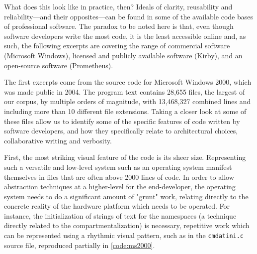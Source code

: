 \vspace*{1\baselineskip}

What does this look like in practice, then? Ideals of clarity, reusability and reliability—and their opposites—can be found in some of the available code bases of professional software. The paradox to be noted here is that, even though software developers write the most code, it is the least accessible online and, as such, the following excerpts are covering the range of commercial software (Microsoft Windows), licensed and publicly available software (Kirby), and an open-source software (Prometheus).

The first excerpts come from the source code for Microsoft Windows 2000, which was made public in 2004. The program text contains  28,655 files, the largest of our  corpus, by multiple orders of magnitude, with 13,468,327 combined lines and including more than 10 different file extensions. Taking a closer look at some of these files allow us to identify some of the specific features of code written by software developers, and how they specifically relate to architectural choices, collaborative writing and verbosity.

First, the most striking visual feature of the code is its sheer size. Representing such a versatile and low-level system such as an operating system manifest themselves in files that are often above 2000 lines of code. In order to allow abstraction techniques at a higher-level for the end-developer, the operating system needs to do a significant amount of "grunt" work, relating directly to the concrete reality of the hardware platform which needs to be operated. For instance, the initialization of strings of text for the namespaces (a technique directly related to the compartmentalization) is necessary, repetitive work which can be represented using a rhythmic visual pattern, such as in the \lstinline{cmdatini.c} source file, reproduced partially in \ref{code:ms2000}.

